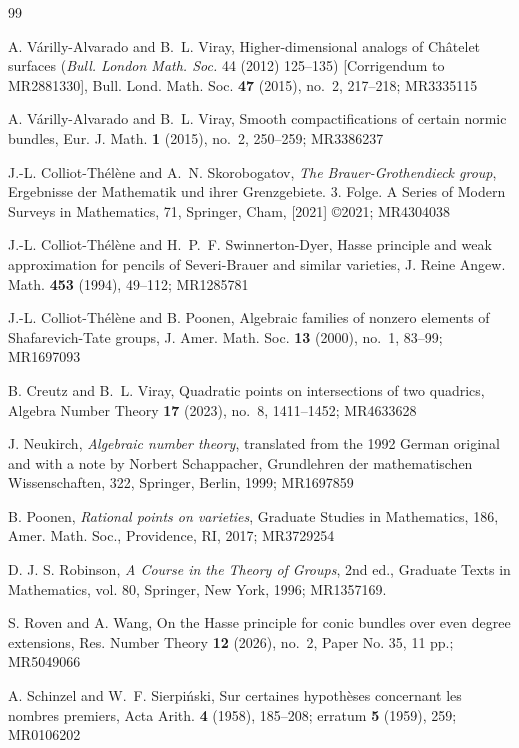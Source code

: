 \documentclass[10pt]{amsart}
\theoremstyle{plain}
\theoremstyle{definition}
\begin{document}
\begin{thebibliography}{99}

A. V\'arilly-Alvarado and B.~L. Viray, Higher-dimensional analogs of Ch\^atelet surfaces ({\it Bull. London Math. Soc.} 44 (2012) 125--135) [Corrigendum to MR2881330], Bull. Lond. Math. Soc. {\bf 47} (2015), no.~2, 217--218; MR3335115

A. V\'arilly-Alvarado and B.~L. Viray, Smooth compactifications of certain normic bundles, Eur. J. Math. {\bf 1} (2015), no.~2, 250--259; MR3386237

 J.-L. Colliot-Th\'el\`ene and A.~N. Skorobogatov, {\it The Brauer-Grothendieck group}, Ergebnisse der Mathematik und ihrer Grenzgebiete. 3. Folge. A Series of Modern Surveys in Mathematics, 71, Springer, Cham, [2021] \copyright 2021; MR4304038

 J.-L. Colliot-Th\'el\`ene and H.~P.~F. Swinnerton-Dyer, Hasse principle and weak approximation for pencils of Severi-Brauer and similar varieties, J. Reine Angew. Math. {\bf 453} (1994), 49--112; MR1285781

J.-L. Colliot-Th\'el\`ene and B. Poonen, Algebraic families of nonzero elements of Shafarevich-Tate groups, J. Amer. Math. Soc. {\bf 13} (2000), no.~1, 83--99; MR1697093

 B. Creutz and B.~L. Viray, Quadratic points on intersections of two quadrics, Algebra Number Theory {\bf 17} (2023), no.~8, 1411--1452; MR4633628

J. Neukirch, {\it Algebraic number theory}, translated from the 1992 German original and with a note by Norbert Schappacher, 
Grundlehren der mathematischen Wissenschaften, 322, Springer, Berlin, 1999; MR1697859

B. Poonen, {\it Rational points on varieties}, Graduate Studies in Mathematics, 186, Amer. Math. Soc., Providence, RI, 2017; MR3729254

D. J. S. Robinson, {\it A Course in the Theory of Groups}, 2nd ed., Graduate Texts in Mathematics, vol. 80, Springer, New York, 1996; MR1357169.

 S. Roven and A. Wang, On the Hasse principle for conic bundles over even degree extensions, Res. Number Theory {\bf 12} (2026), no.~2, Paper No. 35, 11 pp.; MR5049066

A. Schinzel and W.~F. Sierpi\'nski, Sur certaines hypoth\`eses concernant les nombres premiers, Acta Arith. {\bf 4} (1958), 185--208; erratum {\bf 5} (1959), 259; MR0106202


\end{thebibliography}
\end{document}
